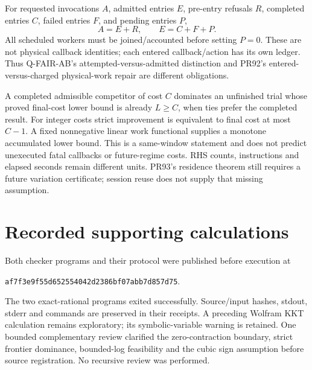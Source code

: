 \documentclass[aps,pra,reprint,onecolumn,10pt,notitlepage,nofootinbib]{revtex4-2}
\begin{document}
For requested invocations $A$, admitted entries $E$, pre-entry refusals $R$,
completed entries $C$, failed entries $F$, and pending entries $P$,
\begin{equation}
 A=E+R,\qquad E=C+F+P.                                      \label{eq:accounting}
\end{equation}
All scheduled workers must be joined/accounted before setting $P=0$.
These are not physical callback identities; each entered callback/action has
its own ledger. Thus Q-FAIR-AB's attempted-versus-admitted distinction and
PR92's entered-versus-charged physical-work repair are different obligations.

A completed admissible competitor of cost $C$ dominates an unfinished trial
whose proved final-cost lower bound is already $L\ge C$, when ties prefer
the completed result. For integer costs strict improvement is equivalent to
final cost at most $C-1$. A fixed nonnegative linear work functional supplies
a monotone accumulated lower bound. This is a same-window statement and
does not predict unexecuted fatal callbacks or future-regime costs. RHS counts,
instructions and elapsed seconds remain different units. PR93's residence
theorem still requires a future variation certificate; session reuse does
not supply that missing assumption.

\section{Recorded supporting calculations}

Both checker programs and their protocol were published before execution at
\par\noindent\texttt{af7f3e9f55d652554042d2386bf07abb7d857d75}.
\par The two exact-rational programs exited successfully. Source/input hashes,
stdout, stderr and commands are preserved in their receipts. A preceding
Wolfram KKT calculation remains exploratory; its symbolic-variable warning
is retained. One bounded complementary review clarified the zero-contraction
boundary, strict frontier dominance, bounded-log feasibility and the cubic
sign assumption before source registration. No recursive review was performed.
\end{document}

